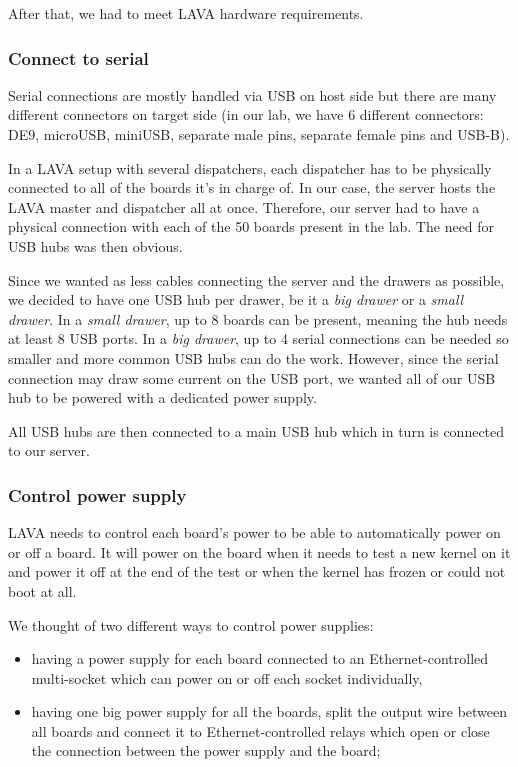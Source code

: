 After that, we had to meet LAVA hardware requirements.

\subsubsection{Connect to serial}

Serial connections are mostly handled via USB on host side but there are many different connectors on target side (in our lab, we have 6 different connectors: DE9, microUSB, miniUSB, separate male pins, separate female pins and USB-B).

In a LAVA setup with several dispatchers, each dispatcher has to be physically connected to all of the boards it's in charge of. In our case, the server hosts the LAVA master and dispatcher all at once. Therefore, our server had to have a physical connection with each of the 50 boards present in the lab. The need for USB hubs was then obvious.

Since we wanted as less cables connecting the server and the drawers as possible, we decided to have one USB hub per drawer, be it a \textit{big drawer} or a \textit{small drawer}. In a \textit{small drawer}, up to 8 boards can be present, meaning the hub needs at least 8 USB ports. In a \textit{big drawer}, up to 4 serial connections can be needed so smaller and more common USB hubs can do the work. However, since the serial connection may draw some current on the USB port, we wanted all of our USB hub to be powered with a dedicated power supply.

All USB hubs are then connected to a main USB hub which in turn is connected to our server.

\subsubsection{Control power supply}

LAVA needs to control each board's power to be able to automatically power on or off a board. It will power on the board when it needs to test a new kernel on it and power it off at the end of the test or when the kernel has frozen or could not boot at all.

We thought of two different ways to control power supplies:
\begin{itemize}
  \item having a power supply for each board connected to an Ethernet-controlled multi-socket which can power on or off each socket individually,
  \item having one big power supply for all the boards, split the output wire between all boards and connect it to Ethernet-controlled relays which open or close the connection between the power supply and the board;
\end{itemize}

